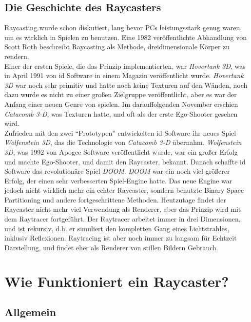 \documentclass[a4paper,12pt]{report}
\begin{document}
\subsection{Die Geschichte des Raycasters}
Raycasting wurde schon diskutiert, lang bevor PCs leistungsstark genug waren, um es wirklich in Spielen zu benutzen. Eine 1982 veröffentlichte Abhandlung von Scott Roth beschreibt Raycasting als Methode, dreidimensionale Körper zu rendern. \\
Einer der ersten Spiele, die das Prinzip implementierten, war \textit{Hovertank 3D}, was in April 1991 von id Software in einem Magazin veröffentlicht wurde. \textit{Hovertank 3D} war noch sehr primitiv und hatte noch keine Texturen auf den Wänden, noch dazu wurde es nicht zu einer großen Zielgruppe veröffentlicht, aber es war der Anfang einer neuen Genre von spielen. Im darauffolgenden November erschien \textit{Catacomb 3-D}, was Texturen hatte, und oft als der erste Ego-Shooter gesehen wird. \\
Zufrieden mit den zwei ``Prototypen'' entwickelten id Software ihr neues Spiel \textit{Wolfenstein 3D}, das die Technologie von \textit{Catacomb 3-D} übernahm. \textit{Wolfenstein 3D}, was 1992 von Apogee Software veröffentlicht wurde, war ein großer Erfolg und machte Ego-Shooter, und damit den Raycaster, bekannt. Danach schaffte id Software das revolutionäre Spiel \textit{DOOM}. \textit{DOOM} war ein noch viel größerer Erfolg, der einen sehr verbesserten Spiel-Engine hatte. Das neue Engine war jedoch nicht wirklich mehr ein echter Raycaster, sondern benutzte Binary Space Partitioning und andere fortgeschrittene Methoden. Heutzutage findet der Raycaster nicht mehr viel Verwendung als Renderer, aber das Prinzip wird mit dem Raytracer fortgeführt. Der Raytracer arbeitet immer in drei Dimensionen, und ist rekursiv, d.h. er simuliert den kompletten Gang eines Lichtstrahles, inklusiv Reflexionen. Raytracing ist aber noch immer zu langsam für Echtzeit Darstellung, und findet eher als Renderer von stillen Bildern Gebrauch.

\section{Wie Funktioniert ein Raycaster?}
\subsection{Allgemein}
\end{document}
